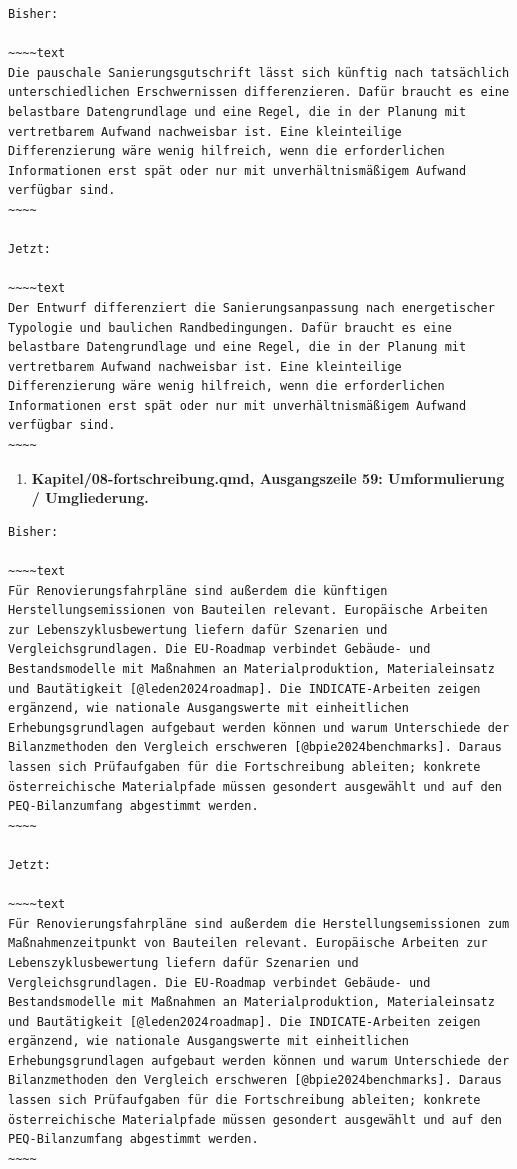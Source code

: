 \documentclass[
  ngerman,
  a4paper,
  DIV=11]{scrreprt}
\providecommand{\tightlist}{%
  \setlength{\itemsep}{0pt}\setlength{\parskip}{0pt}}
\begin{document}
\begin{verbatim}
Bisher:

~~~~text
Die pauschale Sanierungsgutschrift lässt sich künftig nach tatsächlich unterschiedlichen Erschwernissen differenzieren. Dafür braucht es eine belastbare Datengrundlage und eine Regel, die in der Planung mit vertretbarem Aufwand nachweisbar ist. Eine kleinteilige Differenzierung wäre wenig hilfreich, wenn die erforderlichen Informationen erst spät oder nur mit unverhältnismäßigem Aufwand verfügbar sind.
~~~~

Jetzt:

~~~~text
Der Entwurf differenziert die Sanierungsanpassung nach energetischer Typologie und baulichen Randbedingungen. Dafür braucht es eine belastbare Datengrundlage und eine Regel, die in der Planung mit vertretbarem Aufwand nachweisbar ist. Eine kleinteilige Differenzierung wäre wenig hilfreich, wenn die erforderlichen Informationen erst spät oder nur mit unverhältnismäßigem Aufwand verfügbar sind.
~~~~
\end{verbatim}

\begin{enumerate}
\def\labelenumi{\arabic{enumi}.}
\setcounter{enumi}{123}
\tightlist
\item
  \textbf{Kapitel/08-fortschreibung.qmd, Ausgangszeile 59:
  Umformulierung / Umgliederung.}
\end{enumerate}

\begin{verbatim}
Bisher:

~~~~text
Für Renovierungsfahrpläne sind außerdem die künftigen Herstellungsemissionen von Bauteilen relevant. Europäische Arbeiten zur Lebenszyklusbewertung liefern dafür Szenarien und Vergleichsgrundlagen. Die EU-Roadmap verbindet Gebäude- und Bestandsmodelle mit Maßnahmen an Materialproduktion, Materialeinsatz und Bautätigkeit [@leden2024roadmap]. Die INDICATE-Arbeiten zeigen ergänzend, wie nationale Ausgangswerte mit einheitlichen Erhebungsgrundlagen aufgebaut werden können und warum Unterschiede der Bilanzmethoden den Vergleich erschweren [@bpie2024benchmarks]. Daraus lassen sich Prüfaufgaben für die Fortschreibung ableiten; konkrete österreichische Materialpfade müssen gesondert ausgewählt und auf den PEQ-Bilanzumfang abgestimmt werden.
~~~~

Jetzt:

~~~~text
Für Renovierungsfahrpläne sind außerdem die Herstellungsemissionen zum Maßnahmenzeitpunkt von Bauteilen relevant. Europäische Arbeiten zur Lebenszyklusbewertung liefern dafür Szenarien und Vergleichsgrundlagen. Die EU-Roadmap verbindet Gebäude- und Bestandsmodelle mit Maßnahmen an Materialproduktion, Materialeinsatz und Bautätigkeit [@leden2024roadmap]. Die INDICATE-Arbeiten zeigen ergänzend, wie nationale Ausgangswerte mit einheitlichen Erhebungsgrundlagen aufgebaut werden können und warum Unterschiede der Bilanzmethoden den Vergleich erschweren [@bpie2024benchmarks]. Daraus lassen sich Prüfaufgaben für die Fortschreibung ableiten; konkrete österreichische Materialpfade müssen gesondert ausgewählt und auf den PEQ-Bilanzumfang abgestimmt werden.
~~~~
\end{verbatim}
\end{document}
